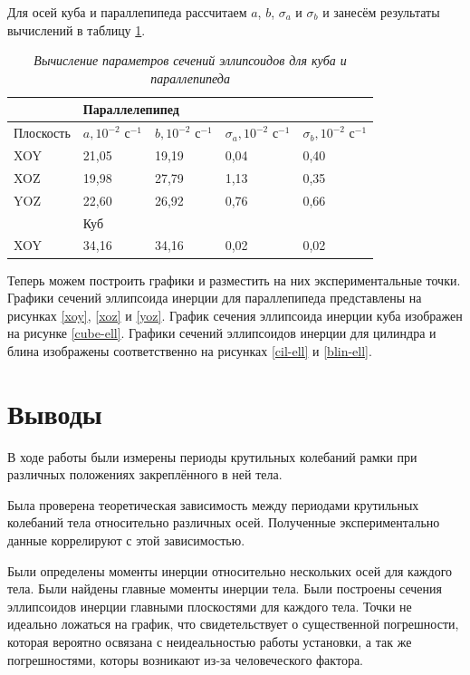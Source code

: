 \documentclass[a4paper, 12pt]{article}
\begin{document}
Для осей куба и параллепипеда рассчитаем $a$, $b$, $\sigma_{a}$ и $\sigma_{b}$ и занесём результаты вычислений в таблицу \ref{mnk-cp}.

\begin{table}[!ht]
    \centering
    \begin{tabular}{|l|l|l|l|l|}
    \hline
        ~ & \multicolumn{4}{l|}{Параллелепипед} \\ \hline
        Плоскость & $a, 10^{-2} \text{ с} ^{-1}$ & $b, 10^{-2} \text{ с} ^{-1}$ & $\sigma_{a}, 10^{-2} \text{ с} ^{-1}$ & $\sigma_{b}, 10^{-2} \text{ с} ^{-1}$ \\ \hline
        XOY & 21,05 & 19,19 & 0,04 & 0,40 \\ \hline
        XOZ & 19,98 & 27,79 & 1,13 & 0,35 \\ \hline
        YOZ & 22,60 & 26,92 & 0,76 & 0,66 \\ \hline
        ~ & \multicolumn{4}{l|}{Куб} \\ \hline
        XOY & 34,16 & 34,16 & 0,02 & 0,02 \\ \hline
    \end{tabular}\caption{\textit{Вычисление параметров сечений эллипсоидов для куба и параллепипеда}}\label{mnk-cp}
\end{table}

Теперь можем построить графики и разместить на них экспериментальные точки. Графики сечений эллипсоида инерции для параллепипеда представлены на рисунках \ref{xoy}, \ref{xoz} и \ref{yoz}. График сечения эллипсоида инерции куба изображен на рисунке \ref{cube-ell}. Графики сечений эллипсоидов инерции для цилиндра и блина изображены соответственно на рисунках \ref{cil-ell} и \ref{blin-ell}.

\section{Выводы}

В ходе работы были измерены периоды крутильных колебаний рамки при различных положениях закреплённого в ней тела.

Была проверена теоретическая зависимость между периодами крутильных колебаний тела относительно различных осей. Полученные экспериментально данные коррелируют с этой зависимостью.

Были определены моменты инерции относительно нескольких осей для каждого тела. Были найдены главные моменты инерции тела. Были построены сечения эллипсоидов инерции главными плоскостями для каждого тела. Точки не идеально ложаться на график, что свидетельствует о существенной погрешности, которая вероятно освязана с неидеальностью работы установки, а так же погрешностями, которы возникают из-за человеческого фактора.
\end{document}
